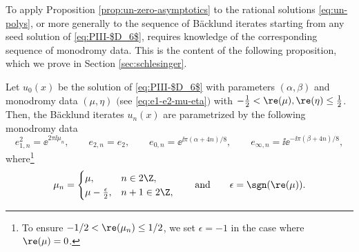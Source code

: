 To apply Proposition \ref{prop:un-zero-asymptotics} to the rational solutions \eqref{eq:un-polys}, or more generally to the sequence of B\"acklund iterates starting from any seed solution of \eqref{eq:PIII-$D_6$}, requires knowledge of the corresponding sequence of monodromy data. This is the content of the following proposition, which we prove in Section \ref{sec:schlesinger}.
\begin{prop}\label{prop:schlesinger}
Let $u_0(x)$ be the solution of \eqref{eq:PIII-$D_6$} with parameters $(\alpha,\beta)$ and monodromy data $(\mu,\eta)$ $($see \eqref{eq:e1-e2-mu-eta}$)$ with $-\frac{1}{2}<\re (\mu), \re(\eta)\le\frac{1}{2}$. Then, the B\"acklund iterates $u_n(x)$ are parametrized by the following monodromy data
\[
e^2_{1, n} = \ee^{2\pi \ii \mu_n} ,\qquad e_{2, n} = e_2, \qquad e_{0,n}=\ee^{{\ii\pi(\alpha+4n)}/{8}}, \qquad e_{\infty,n}=\ii\ee^{-{\ii\pi(\beta+4n)}/{8}}, \]
where\footnote{To ensure $-1/2<\re(\mu_n)\leq 1/2$, we set $\epsilon = -1$ in the case where $\re(\mu) = 0$.}
\[
\mu_n = \begin{cases} \mu, & n \in 2\Z, \\ \mu - \frac{\epsilon}{2}, & n + 1 \in 2\Z, \end{cases} \qquad \text{and}\qquad \epsilon = \sgn (\re (\mu)).
\]
\end{prop}

